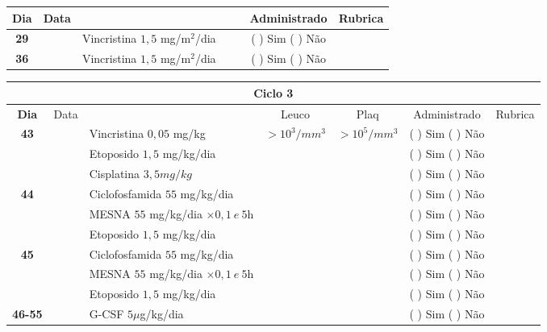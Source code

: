 \documentclass[11pt,a4paper,oldfontcommands]{memoir}
\begin{document}
\begin{center}
\begin{table}[H]
\begin{tabular}{p{1cm}c|p{4.6cm}|p{2cm}p{2cm}|c|c}
	\hline
	\multicolumn{1}{c|}{\multirow{1}{*}{\textbf{Dia}}}&{Data}&{}&{}&&{Administrado}&{Rubrica} \\
    \hline
    \multicolumn{1}{c|}{\textbf{29}}&&{Vincristina \(1,5\) mg/m\(^2\)/dia}&\multicolumn{1}{c}{}&&{(  ) Sim (  ) Não}&\\
    \hline
    \multicolumn{1}{c|}{\textbf{36}}&&{Vincristina \(1,5\) mg/m\(^2\)/dia}&\multicolumn{1}{c}{}&&{(  ) Sim (  ) Não}&\\
    \hline
\end{tabular}
\end{table}
\clearpage
\begin{table}[H] \small
\begin{tabular}{p{1cm}c|p{4.6cm}|p{1.4cm}p{1.4cm}|c|c}
	\hline
	\multicolumn{7}{c}{Ciclo 3} \\
	\hline
	\multicolumn{1}{c|}{\multirow{1}{*}{\textbf{Dia}}}&{Data}&{}&\multicolumn{1}{c|}{Leuco}&\multicolumn{1}{c|}{Plaq}&{Administrado}&{Rubrica} \\
    \hline
    \multicolumn{1}{c|}{\multirow{3}{*}{\textbf{43}}}&&{Vincristina \(0,05\) mg/kg}&\multicolumn{1}{c|}{\(>10^3/mm^3\)}&\multicolumn{1}{c|}{\(>10^5/mm^3\)}&{(  ) Sim (  ) Não}&\\
    \cline{4-5}
    \multicolumn{1}{c|}{}&&{Etoposido \(1,5\) mg/kg/dia}&\multicolumn{1}{c|}{}&&{(  ) Sim (  ) Não}&\\
    \cline{4-5}
    \multicolumn{1}{c|}{}&\multirow{1}{*}{}&{Cisplatina \(3,5mg/kg\)}&&&{(  ) Sim (  ) Não}&\\
    \hline
    \multicolumn{1}{c|}{\multirow{3}{*}{\textbf{44}}}&&{Ciclofosfamida \(55\) mg/kg/dia}&{}&&{(  ) Sim (  ) Não}&\\
    \multicolumn{1}{c|}{}&&{MESNA \(55\) mg/kg/dia \(\times 0,1 \:e\: 5\)h}&&&{(  ) Sim (  ) Não}&\\
    \multicolumn{1}{c|}{}&&{Etoposido \(1,5\) mg/kg/dia}&&&{(  ) Sim (  ) Não}&\\
    \hline
    \multicolumn{1}{c|}{\multirow{3}{*}{\textbf{45}}}&&{Ciclofosfamida \(55\) mg/kg/dia}&{}&&{(  ) Sim (  ) Não}&\\
    \multicolumn{1}{c|}{}&&{MESNA \(55\) mg/kg/dia \(\times 0,1 \:e\: 5\)h}&&&{(  ) Sim (  ) Não}&\\
    \multicolumn{1}{c|}{}&\multirow{1}{*}{}&{Etoposido \(1,5\) mg/kg/dia}&{}&&{(  ) Sim (  ) Não}&\\
    \hline
    \multicolumn{1}{c|}{\textbf{46-55}}&&{G-CSF \(5 \mu\)g/kg/dia }&&&{(  ) Sim (  ) Não}&\\

\end{tabular}
\end{table}
\end{center}
\end{document}

